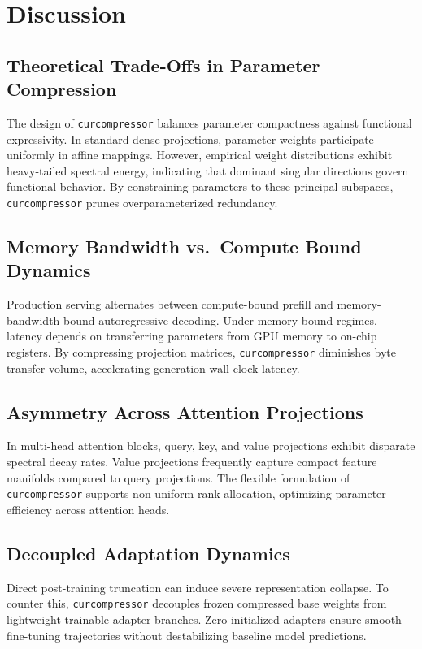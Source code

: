 \section{Discussion}

\subsection{Theoretical Trade-Offs in Parameter Compression}
The design of \texttt{curcompressor} balances parameter compactness against functional expressivity. In standard dense projections, parameter weights participate uniformly in affine mappings. However, empirical weight distributions exhibit heavy-tailed spectral energy, indicating that dominant singular directions govern functional behavior. By constraining parameters to these principal subspaces, \texttt{curcompressor} prunes overparameterized redundancy.

\subsection{Memory Bandwidth vs.\ Compute Bound Dynamics}
Production serving alternates between compute-bound prefill and memory-bandwidth-bound autoregressive decoding. Under memory-bound regimes, latency depends on transferring parameters from GPU memory to on-chip registers. By compressing projection matrices, \texttt{curcompressor} diminishes byte transfer volume, accelerating generation wall-clock latency.

\subsection{Asymmetry Across Attention Projections}
In multi-head attention blocks, query, key, and value projections exhibit disparate spectral decay rates. Value projections frequently capture compact feature manifolds compared to query projections. The flexible formulation of \texttt{curcompressor} supports non-uniform rank allocation, optimizing parameter efficiency across attention heads.

\subsection{Decoupled Adaptation Dynamics}
Direct post-training truncation can induce severe representation collapse. To counter this, \texttt{curcompressor} decouples frozen compressed base weights from lightweight trainable adapter branches. Zero-initialized adapters ensure smooth fine-tuning trajectories without destabilizing baseline model predictions.

